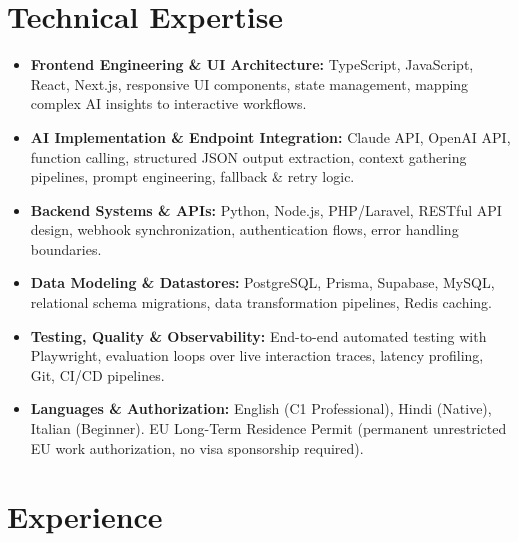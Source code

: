 \documentclass[10pt,a4paper]{article}
\begin{document}
\section{Technical Expertise}
\begin{itemize}
  \item \textbf{Frontend Engineering \& UI Architecture:} TypeScript, JavaScript, React, Next.js, responsive UI components, state management, mapping complex AI insights to interactive workflows.
  \item \textbf{AI Implementation \& Endpoint Integration:} Claude API, OpenAI API, function calling, structured JSON output extraction, context gathering pipelines, prompt engineering, fallback \& retry logic.
  \item \textbf{Backend Systems \& APIs:} Python, Node.js, PHP/Laravel, RESTful API design, webhook synchronization, authentication flows, error handling boundaries.
  \item \textbf{Data Modeling \& Datastores:} PostgreSQL, Prisma, Supabase, MySQL, relational schema migrations, data transformation pipelines, Redis caching.
  \item \textbf{Testing, Quality \& Observability:} End-to-end automated testing with Playwright, evaluation loops over live interaction traces, latency profiling, Git, CI/CD pipelines.
  \item \textbf{Languages \& Authorization:} English (C1 Professional), Hindi (Native), Italian (Beginner). EU Long-Term Residence Permit (permanent unrestricted EU work authorization, no visa sponsorship required).
\end{itemize}

\section{Experience}
\end{document}
